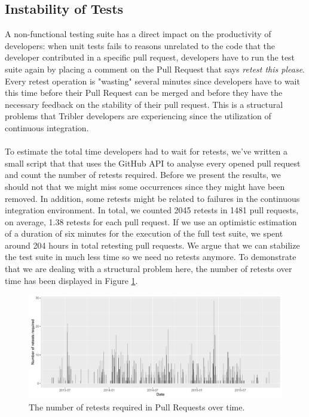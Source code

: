 \subsection{Instability of Tests}
\label{subsec:instability-tests}
A non-functional testing suite has a direct impact on the productivity of developers: when unit tests fails to reasons unrelated to the code that the developer contributed in a specific pull request, developers have to run the test suite again by placing a comment on the Pull Request that says \emph{retest this please}. Every retest operation is "wasting" several minutes since developers have to wait this time before their Pull Request can be merged and before they have the necessary feedback on the stability of their pull request. This is a structural problems that Tribler developers are experiencing since the utilization of continuous integration.\\\\
To estimate the total time developers had to wait for retests, we've written a small script that that uses the GitHub API to analyse every opened pull request and count the number of retests required. Before we present the results, we should not that we might miss some occurrences since they might have been removed. In addition, some retests might be related to failures in the continuous integration environment. In total, we counted 2045 retests in 1481 pull requests, on average, 1.38 retests for each pull request. If we use an optimistic estimation of a duration of six minutes for the execution of the full test suite, we spent around 204 hours in total retesting pull requests. We argue that we can stabilize the test suite in much less time so we need no retests anymore. To demonstrate that we are dealing with a structural problem here, the number of retests over time has been displayed in Figure \ref{fig:retest-this-please-required}.\\

\begin{figure}[h!]
	\centering
	\includegraphics[width=1.0\columnwidth]{images/improving_qa/retests_required}
	\caption{The number of retests required in Pull Requests over time.}
	\label{fig:retest-this-please-required}
\end{figure}


